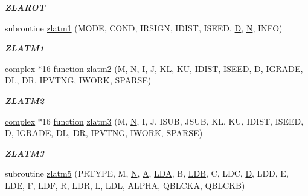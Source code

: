 \begin{DoxyCompactItemize}
\begin{DoxyCompactList}\small\item\em {\bfseries Z\+L\+A\+R\+O\+T} \end{DoxyCompactList}\item 
subroutine \hyperlink{group__complex16__matgen_ga72abba78ce666b84f3743b5716d0af50}{zlatm1} (M\+O\+D\+E, C\+O\+N\+D, I\+R\+S\+I\+G\+N, I\+D\+I\+S\+T, I\+S\+E\+E\+D, \hyperlink{odrpack_8h_a7dae6ea403d00f3687f24a874e67d139}{D}, \hyperlink{polmisc_8c_a0240ac851181b84ac374872dc5434ee4}{N}, I\+N\+F\+O)
\begin{DoxyCompactList}\small\item\em {\bfseries Z\+L\+A\+T\+M1} \end{DoxyCompactList}\item 
\hyperlink{structcomplex}{complex} $\ast$16 \hyperlink{afunc_8m_a7b5e596df91eadea6c537c0825e894a7}{function} \hyperlink{group__complex16__matgen_ga084443ff92c5d0c982b18f15e0ed4136}{zlatm2} (M, \hyperlink{polmisc_8c_a0240ac851181b84ac374872dc5434ee4}{N}, I, J, K\+L, K\+U, I\+D\+I\+S\+T, I\+S\+E\+E\+D, \hyperlink{odrpack_8h_a7dae6ea403d00f3687f24a874e67d139}{D}, I\+G\+R\+A\+D\+E, D\+L, D\+R, I\+P\+V\+T\+N\+G, I\+W\+O\+R\+K, S\+P\+A\+R\+S\+E)
\begin{DoxyCompactList}\small\item\em {\bfseries Z\+L\+A\+T\+M2} \end{DoxyCompactList}\item 
\hyperlink{structcomplex}{complex} $\ast$16 \hyperlink{afunc_8m_a7b5e596df91eadea6c537c0825e894a7}{function} \hyperlink{group__complex16__matgen_ga93b637aec8e2f54e9dc10f3120fa4f2e}{zlatm3} (M, \hyperlink{polmisc_8c_a0240ac851181b84ac374872dc5434ee4}{N}, I, J, I\+S\+U\+B, J\+S\+U\+B, K\+L, K\+U, I\+D\+I\+S\+T, I\+S\+E\+E\+D, \hyperlink{odrpack_8h_a7dae6ea403d00f3687f24a874e67d139}{D}, I\+G\+R\+A\+D\+E, D\+L, D\+R, I\+P\+V\+T\+N\+G, I\+W\+O\+R\+K, S\+P\+A\+R\+S\+E)
\begin{DoxyCompactList}\small\item\em {\bfseries Z\+L\+A\+T\+M3} \end{DoxyCompactList}\item 
subroutine \hyperlink{group__complex16__matgen_ga62bcad442fe49fc61766de9b3e82cbac}{zlatm5} (P\+R\+T\+Y\+P\+E, M, \hyperlink{polmisc_8c_a0240ac851181b84ac374872dc5434ee4}{N}, \hyperlink{classA}{A}, \hyperlink{example__user_8c_ae946da542ce0db94dced19b2ecefd1aa}{L\+D\+A}, B, \hyperlink{example__user_8c_a50e90a7104df172b5a89a06c47fcca04}{L\+D\+B}, C, L\+D\+C, \hyperlink{odrpack_8h_a7dae6ea403d00f3687f24a874e67d139}{D}, L\+D\+D, E, L\+D\+E, F, L\+D\+F, R, L\+D\+R, L, L\+D\+L, A\+L\+P\+H\+A, Q\+B\+L\+C\+K\+A, Q\+B\+L\+C\+K\+B)

\end{DoxyCompactItemize}

